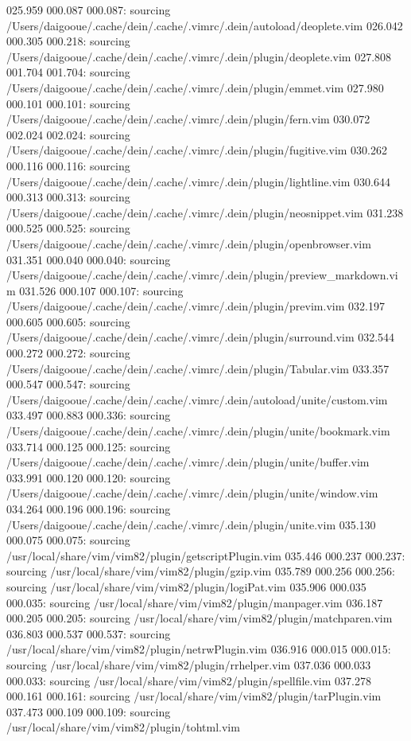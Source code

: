 025.959  000.087  000.087: sourcing /Users/daigooue/.cache/dein/.cache/.vimrc/.dein/autoload/deoplete.vim
026.042  000.305  000.218: sourcing /Users/daigooue/.cache/dein/.cache/.vimrc/.dein/plugin/deoplete.vim
027.808  001.704  001.704: sourcing /Users/daigooue/.cache/dein/.cache/.vimrc/.dein/plugin/emmet.vim
027.980  000.101  000.101: sourcing /Users/daigooue/.cache/dein/.cache/.vimrc/.dein/plugin/fern.vim
030.072  002.024  002.024: sourcing /Users/daigooue/.cache/dein/.cache/.vimrc/.dein/plugin/fugitive.vim
030.262  000.116  000.116: sourcing /Users/daigooue/.cache/dein/.cache/.vimrc/.dein/plugin/lightline.vim
030.644  000.313  000.313: sourcing /Users/daigooue/.cache/dein/.cache/.vimrc/.dein/plugin/neosnippet.vim
031.238  000.525  000.525: sourcing /Users/daigooue/.cache/dein/.cache/.vimrc/.dein/plugin/openbrowser.vim
031.351  000.040  000.040: sourcing /Users/daigooue/.cache/dein/.cache/.vimrc/.dein/plugin/preview_markdown.vim
031.526  000.107  000.107: sourcing /Users/daigooue/.cache/dein/.cache/.vimrc/.dein/plugin/previm.vim
032.197  000.605  000.605: sourcing /Users/daigooue/.cache/dein/.cache/.vimrc/.dein/plugin/surround.vim
032.544  000.272  000.272: sourcing /Users/daigooue/.cache/dein/.cache/.vimrc/.dein/plugin/Tabular.vim
033.357  000.547  000.547: sourcing /Users/daigooue/.cache/dein/.cache/.vimrc/.dein/autoload/unite/custom.vim
033.497  000.883  000.336: sourcing /Users/daigooue/.cache/dein/.cache/.vimrc/.dein/plugin/unite/bookmark.vim
033.714  000.125  000.125: sourcing /Users/daigooue/.cache/dein/.cache/.vimrc/.dein/plugin/unite/buffer.vim
033.991  000.120  000.120: sourcing /Users/daigooue/.cache/dein/.cache/.vimrc/.dein/plugin/unite/window.vim
034.264  000.196  000.196: sourcing /Users/daigooue/.cache/dein/.cache/.vimrc/.dein/plugin/unite.vim
035.130  000.075  000.075: sourcing /usr/local/share/vim/vim82/plugin/getscriptPlugin.vim
035.446  000.237  000.237: sourcing /usr/local/share/vim/vim82/plugin/gzip.vim
035.789  000.256  000.256: sourcing /usr/local/share/vim/vim82/plugin/logiPat.vim
035.906  000.035  000.035: sourcing /usr/local/share/vim/vim82/plugin/manpager.vim
036.187  000.205  000.205: sourcing /usr/local/share/vim/vim82/plugin/matchparen.vim
036.803  000.537  000.537: sourcing /usr/local/share/vim/vim82/plugin/netrwPlugin.vim
036.916  000.015  000.015: sourcing /usr/local/share/vim/vim82/plugin/rrhelper.vim
037.036  000.033  000.033: sourcing /usr/local/share/vim/vim82/plugin/spellfile.vim
037.278  000.161  000.161: sourcing /usr/local/share/vim/vim82/plugin/tarPlugin.vim
037.473  000.109  000.109: sourcing /usr/local/share/vim/vim82/plugin/tohtml.vim
